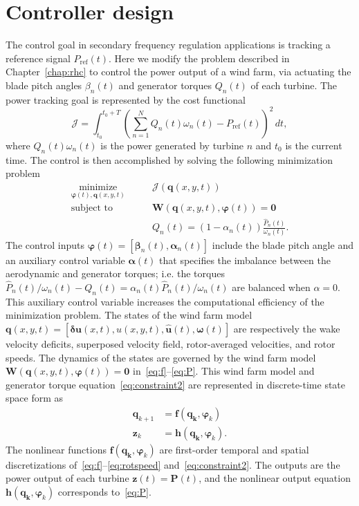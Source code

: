 \section{Controller design}
\label{sec:rhc2-control}
The control goal in secondary frequency regulation applications is tracking a reference signal $P_\text{ref}(t)$. Here we modify the problem described in Chapter~\ref{chap:rhc} to control the power output of a wind farm, via actuating the blade pitch angles $\beta_n(t)$ and generator torques $Q_n(t)$ of each turbine. The power tracking goal is represented by the cost functional 
\label{sec:controller}
\begin{equation}
\mathcal{J} = \int_{t_0}^{t_0+T} \left( \sum_{n=1}^N Q_n(t) \omega_n(t) - P_\text{ref}(t)\right)^2 \, dt,
\end{equation}
where $Q_n(t) \omega_n(t)$ is the power generated by turbine $n$ and $t_0$ is the current time. The control is then accomplished by solving the following minimization problem
\begin{align}
\label{eq:minimize_J}
\underset{\boldsymbol \varphi(t), \mathbf{q}(x,y,t)}{\text{minimize}} \qquad & \mathcal{J}(\mathbf{q}(x,y,t)) \\
\label{eq:constraint1}
\text{subject to} \qquad& \mathbf{W}(\mathbf{q}(x,y,t), \boldsymbol \varphi(t)) = \mathbf{0} \\
\label{eq:constraint2}
& Q_n(t) = \left(1-\alpha_n(t)\right) \frac{\hat{P}_n(t)}{\omega_n(t)}.
\end{align}
The control inputs $\boldsymbol \varphi(t) = \left[ \boldsymbol \beta_n(t), \boldsymbol \alpha_n(t) \right]$ include the blade pitch angle and an auxiliary control variable $\boldsymbol \alpha(t)$ that specifies the imbalance between the aerodynamic and generator torques; i.e. the torques $\hat{P}_n(t)/\omega_n(t) - Q_n(t) = \alpha_n(t) \hat{P}_n(t)/\omega_n(t)$ are balanced when $\alpha = 0$. This auxiliary control variable increases the computational efficiency of the minimization problem. The states of the wind farm model $\mathbf{q}(x,y,t) = \left[  \boldsymbol \delta \mathbf{u}(x,t), u(x,y,t), \mathbf{\hat{u}}(t), \boldsymbol \omega(t)\right]$ are respectively the wake velocity deficits, superposed velocity field, rotor-averaged velocities, and rotor speeds. The dynamics of the states are governed by the wind farm model \mbox{$\mathbf{W}(\mathbf{q}(x,y,t), \boldsymbol \varphi(t)) = \mathbf{0}$} in~\eqref{eq:f}--\eqref{eq:P}. This wind farm model and generator torque equation~\eqref{eq:constraint2} are represented in discrete-time state space form as
\begin{align}
\mathbf{q}_{k+1} &= \mathbf{f}(\mathbf{q_k}, \boldsymbol \varphi_k)\\
\mathbf{z}_{k} &= \mathbf{h}(\mathbf{q_k}, \boldsymbol \varphi_k).
\end{align}
The nonlinear functions $\mathbf{f}(\mathbf{q_k}, \boldsymbol \varphi_k)$ are first-order temporal and spatial discretizations of~\eqref{eq:f}--\eqref{eq:rotspeed} and~\eqref{eq:constraint2}. The outputs are the power output of each turbine $\mathbf{z}(t) = \mathbf{P}(t)$, and the nonlinear output  equation $\mathbf{h}(\mathbf{q_k}, \boldsymbol \varphi_k)$ corresponds to~\eqref{eq:P}. 

